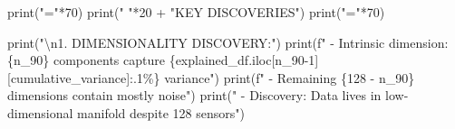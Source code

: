\documentclass[
  letterpaper,
  DIV=11,
  numbers=noendperiod]{scrartcl}
\newenvironment{Shaded}{\begin{snugshade}}{\end{snugshade}}
\newcommand{\BuiltInTok}[1]{\textcolor[rgb]{0.00,0.23,0.31}{#1}}
\newcommand{\CharTok}[1]{\textcolor[rgb]{0.13,0.47,0.30}{#1}}
\newcommand{\DecValTok}[1]{\textcolor[rgb]{0.68,0.00,0.00}{#1}}
\newcommand{\NormalTok}[1]{\textcolor[rgb]{0.00,0.23,0.31}{#1}}
\newcommand{\OperatorTok}[1]{\textcolor[rgb]{0.37,0.37,0.37}{#1}}
\newcommand{\SpecialCharTok}[1]{\textcolor[rgb]{0.37,0.37,0.37}{#1}}
\newcommand{\SpecialStringTok}[1]{\textcolor[rgb]{0.13,0.47,0.30}{#1}}
\newcommand{\StringTok}[1]{\textcolor[rgb]{0.13,0.47,0.30}{#1}}
\renewenvironment{Shaded}{%
  \begin{tcolorbox}[%
    enhanced,%
    colback=codebg,%
    colframe=codebg,%
    borderline west={3pt}{0pt}{sectionblue},%
    fontupper=\small\ttfamily,%
    boxrule=0pt,%
    arc=0pt,%
    boxsep=5pt,%
    left=2mm,%
    right=2mm,%
    top=2mm,%
    bottom=2mm%
  ]%
}{%
  \end{tcolorbox}%
}
\begin{document}
\begin{Shaded}
\begin{Highlighting}[]
\BuiltInTok{print}\NormalTok{(}\StringTok{"="}\OperatorTok{*}\DecValTok{70}\NormalTok{)}
\BuiltInTok{print}\NormalTok{(}\StringTok{" "}\OperatorTok{*}\DecValTok{20} \OperatorTok{+} \StringTok{"KEY DISCOVERIES"}\NormalTok{)}
\BuiltInTok{print}\NormalTok{(}\StringTok{"="}\OperatorTok{*}\DecValTok{70}\NormalTok{)}

\BuiltInTok{print}\NormalTok{(}\StringTok{"}\CharTok{\textbackslash{}n}\StringTok{1. DIMENSIONALITY DISCOVERY:"}\NormalTok{)}
\BuiltInTok{print}\NormalTok{(}\SpecialStringTok{f"   {-} Intrinsic dimension: }\SpecialCharTok{\{}\NormalTok{n\_90}\SpecialCharTok{\}}\SpecialStringTok{ components capture }\SpecialCharTok{\{}\NormalTok{explained\_df}\SpecialCharTok{.}\NormalTok{iloc[n\_90}\OperatorTok{{-}}\DecValTok{1}\NormalTok{][}\StringTok{\textquotesingle{}cumulative\_variance\textquotesingle{}}\NormalTok{]}\SpecialCharTok{:.1\%\}}\SpecialStringTok{ variance"}\NormalTok{)}
\BuiltInTok{print}\NormalTok{(}\SpecialStringTok{f"   {-} Remaining }\SpecialCharTok{\{}\DecValTok{128} \OperatorTok{{-}}\NormalTok{ n\_90}\SpecialCharTok{\}}\SpecialStringTok{ dimensions contain mostly noise"}\NormalTok{)}
\BuiltInTok{print}\NormalTok{(}\StringTok{"   {-} Discovery: Data lives in low{-}dimensional manifold despite 128 sensors"}\NormalTok{)}


\end{Highlighting}
\end{Shaded}
\end{document}
